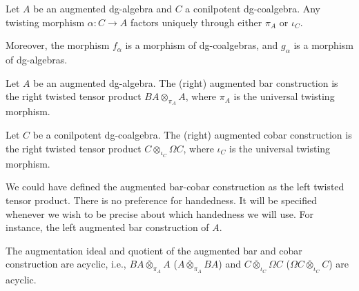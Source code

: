 \documentclass[../thesis.tex]{subfiles}
\begin{document}
            \begin{corollary}\label{cor: universal-twisting}
                Let $A$ be an augmented dg-algebra and $C$ a conilpotent dg-coalgebra. Any twisting morphism $\alpha: C \rightarrow A$ factors uniquely through either $\pi_A$ or $\iota_C$.
                
                \begin{center}
                \end{center}
                Moreover, the morphism $f_\alpha$ is a morphism of dg-coalgebras, and $g_\alpha$ is a morphism of dg-algebras.
            \end{corollary}

            \begin{definition}
                Let $A$ be an augmented dg-algebra. The (right) augmented bar construction is the right twisted tensor product $BA \otimes_{\pi_A} A$, where $\pi_A$ is the universal twisting morphism.

                Let $C$ be a conilpotent dg-coalgebra. The (right) augmented cobar construction is the right twisted tensor product $C \otimes_{\iota_C} \Omega C$, where $\iota_C$ is the universal twisting morphism.
            \end{definition}

            \begin{remark}
                We could have defined the augmented bar-cobar construction as the left twisted tensor product. There is no preference for handedness. It will be specified whenever we wish to be precise about which handedness we will use. For instance, the left augmented bar construction of $A$.
            \end{remark}

            \begin{proposition}\label{prop: aug-bar-ac}
                The augmentation ideal and quotient of the augmented bar and cobar construction are acyclic, i.e., $BA \overline{\otimes}_{\pi_A} A$ ($A \overline{\otimes}_{\pi_A} BA$) and $C \overline{\otimes}_{\iota_C}\Omega C$ ($\Omega C \overline{\otimes}_{\iota_C} C$) are acyclic.
            \end{proposition}
\end{document}
